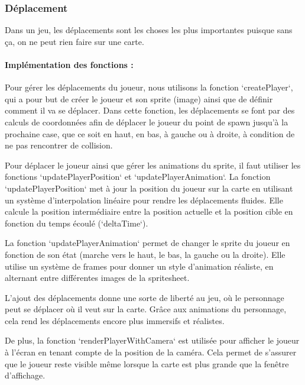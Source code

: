 \documentclass[12pt,a4paper, twoside]{article}
\begin{document}
    \newpage
    \subsubsection{Déplacement}

    Dans un jeu, les déplacements sont les choses les plus importantes puisque sans ça, on ne peut rien faire sur une carte.

    \paragraph{Implémentation des fonctions : }

    Pour gérer les déplacements du joueur, nous utilisons la fonction `createPlayer`, qui a pour but de créer le joueur et son sprite (image) ainsi que de définir comment il va se déplacer. Dans cette fonction, les déplacements se font par des calculs de coordonnées afin de déplacer le joueur du point de spawn jusqu'à la prochaine case, que ce soit en haut, en bas, à gauche ou à droite, à condition de ne pas rencontrer de collision.
    \newline

    Pour déplacer le joueur ainsi que gérer les animations du sprite, il faut utiliser les fonctions `updatePlayerPosition` et `updatePlayerAnimation`. La fonction `updatePlayerPosition` met à jour la position du joueur sur la carte en utilisant un système d'interpolation linéaire pour rendre les déplacements fluides. Elle calcule la position intermédiaire entre la position actuelle et la position cible en fonction du temps écoulé (`deltaTime`).
    \newline

    La fonction `updatePlayerAnimation` permet de changer le sprite du joueur en fonction de son état (marche vers le haut, le bas, la gauche ou la droite). Elle utilise un système de frames pour donner un style d'animation réaliste, en alternant entre différentes images de la spritesheet.
    \newline

    L'ajout des déplacements donne une sorte de liberté au jeu, où le personnage peut se déplacer où il veut sur la carte. Grâce aux animations du personnage, cela rend les déplacements encore plus immersifs et réalistes.
    \newline

    De plus, la fonction `renderPlayerWithCamera` est utilisée pour afficher le joueur à l'écran en tenant compte de la position de la caméra. Cela permet de s'assurer que le joueur reste visible même lorsque la carte est plus grande que la fenêtre d'affichage.
    \newline
\end{document}
